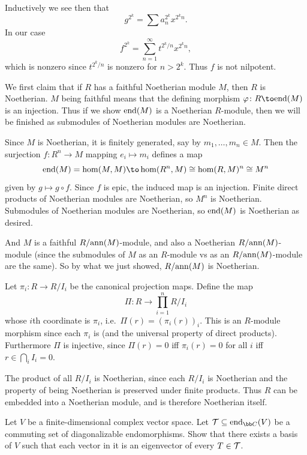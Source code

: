     Inductively we see then that
    $$ g^{2^k} = \sum a_n^{2^k}x^{2^kn} . $$
    In our case
    $$ f^{2^k} = \sum_{n=1}^\infty t^{2^k/n}x^{2^kn} , $$
    which is nonzero since $t^{2^k/n}$ is nonzero for $n>2^k$.
    Thus $f$ is not nilpotent.

    \item We first claim that if $R$ has a faithful Noetherian module $M$, then $R$ is Noetherian.
    $M$ being faithful means that the defining morphism $\phi\colon R\to\endo(M)$ is an injection.
    Thus if we show ${\rm end}(M)$ is a Noetherian $R$-module, then we will be finished as submodules of Noetherian
    modules are Noetherian.

    Since $M$ is Noetherian, it is finitely generated, say by $m_1,\dots,m_n\in M$.
    Then the surjection $f\colon R^n\to M$ mapping $e_i\mapsto m_i$ defines a map
    $$ \endo(M) = \hom(M,M) \to \hom(R^n,M) \cong \hom(R,M)^n \cong M^n $$
    given by $g\mapsto g\circ f$.
    Since $f$ is epic, the induced map is an injection.
    Finite direct products of Noetherian modules are Noetherian, so $M^n$ is Noetherian.
    Submodules of Noetherian modules are Noetherian, so ${\rm end}(M)$ is Noetherian as desired.

    And $M$ is a faithful $R/{\rm ann}(M)$-module, and also a Noetherian $R/{\rm ann}(M)$-module (since the submodules of $M$
    as an $R$-module vs as an $R/{\rm ann}(M)$-module are the same).
    So by what we just showed, $R/{\rm ann}(M)$ is Noetherian.

    \item Let $\pi_i\colon R\to R/I_i$ be the canonical projection maps.
    Define the map
    $$ \Pi\colon R \to \prod_{i=1}^n R/I_i $$
    whose $i$th coordinate is $\pi_i$, i.e.\ $\Pi(r)=(\pi_i(r))_i$.
    This is an $R$-module morphism since each $\pi_i$ is (and the universal property of direct products).
    Furthermore $\Pi$ is injective, since $\Pi(r)=0$ iff $\pi_i(r)=0$ for all $i$ iff $r\in\bigcap_iI_i=0$.

    The product of all $R/I_i$ is Noetherian, since each $R/I_i$ is Noetherian and the property of being Noetherian is
    preserved under finite products.
    Thus $R$ can be embedded into a Noetherian module, and is therefore Noetherian itself.
\eenum

\def\T{{\c T}}

\bprob

    Let $V$ be a finite-dimensional complex vector space.
    Let $\T\subseteq\endo_\bC(V)$ be a commuting set of diagonalizable endomorphisms.
    Show that there exists a basis of $V$ such that each vector in it is an eigenvector of every $T\in\T$.

